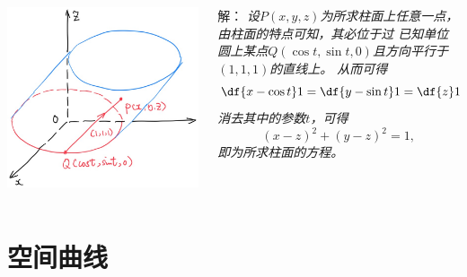 \begin{frame}
	\linespread{1.5}
	\pause

	\small 
	\begin{columns}
		\begin{column}{.4\textwidth}
			\begin{center}
				\includegraphics[width=.9\textwidth]{./images/ch8/cpq.jpg}
			\end{center}
		\end{column}
		\begin{column}{.6\textwidth}
			解：\it
			设$P(x,y,z)$为所求柱面上任意一点，由柱面的特点可知，其必位于过
			已知单位圆上某点$Q(\cos t,\sin t,0)$且方向平行于$(1,1,1)$的直线上。
			从而可得
			$$\df{x-\cos t}1=\df{y-\sin t}1=\df{z}1,$$
			消去其中的参数$t$，可得
			$$(x-z)^2+(y-z)^2=1,$$
			即为所求柱面的方程。\fin
		\end{column}
	\end{columns}
\end{frame}

\section{空间曲线}

